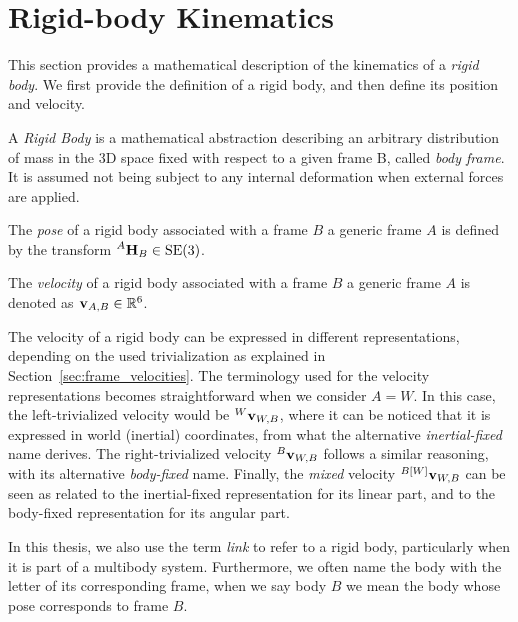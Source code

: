 \section{Rigid-body Kinematics}

This section provides a mathematical description of the kinematics of a \emph{rigid body}.
We first provide the definition of a rigid body, and then define its position and velocity.

\begin{definition*}
%
A \emph{Rigid Body} is a mathematical abstraction describing an arbitrary distribution of mass in the 3D space fixed with respect to a given frame B, called \emph{body frame}.
It is assumed not being subject to any internal deformation when external forces are applied.
%
\end{definition*}

\begin{definition*}
%
The \emph{pose} of a rigid body associated with a frame $B$ \wrt a generic frame $A$ is defined by the transform $\homo[A]_B \in \SE(3)$.
%
\end{definition*}

\begin{definition*}
%
The \emph{velocity} of a rigid body associated with a frame $B$ \wrt a generic frame $A$ is denoted as $\velsix_{A,B} \in \realn^6$.
%
\end{definition*}

\begin{remark*}
%
The velocity of a rigid body can be expressed in different representations, depending on the used trivialization as explained in Section~\ref{sec:frame_velocities}.
The terminology used for the velocity representations becomes straightforward when we consider $A=W$.
In this case, the left-trivialized velocity would be $\velsix[W]_{W,B}$, where it can be noticed that it is expressed in world (inertial) coordinates, from what the alternative \emph{inertial-fixed} name derives.
The right-trivialized velocity $\velsix[B]_{W,B}$ follows a similar reasoning, with its alternative \emph{body-fixed} name.
Finally, the \emph{mixed} velocity $\velsix[{B[W]}]_{W, B}$ can be seen as related to the inertial-fixed representation for its linear part, and to the body-fixed representation for its angular part.
%
\end{remark*}

\begin{remark*}[Terminology]
%
In this thesis, we also use the term \emph{link} to refer to a rigid body, particularly when it is part of a multibody system.
Furthermore, we often name the body with the letter of its corresponding frame, \ie when we say body $B$ we mean the body whose pose corresponds to frame $B$.
%
\end{remark*}

